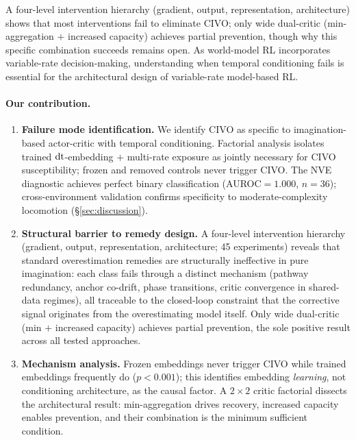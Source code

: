  A four-level intervention hierarchy (gradient, output, representation, architecture) shows that most interventions fail to eliminate CIVO; only wide dual-critic (min-aggregation $+$ increased capacity) achieves partial prevention, though why this specific combination succeeds remains open. As world-model RL incorporates variable-rate decision-making, understanding when temporal conditioning fails is essential for the architectural design of variable-rate model-based RL.

\paragraph{Our contribution.}
\begin{enumerate}[nosep,leftmargin=*]
    \item \textbf{Failure mode identification.} We identify CIVO as specific to imagination-based actor-critic with temporal conditioning. Factorial analysis isolates trained $\mathrm{dt}$-embedding $+$ multi-rate exposure as jointly necessary for CIVO susceptibility; frozen and removed controls never trigger CIVO. The NVE diagnostic achieves perfect binary classification (AUROC${=}1.000$, $n{=}36$); cross-environment validation confirms specificity to moderate-complexity locomotion (\S\ref{sec:discussion}).
    \item \textbf{Structural barrier to remedy design.} A four-level intervention hierarchy (gradient, output, representation, architecture; 45 experiments) reveals that standard overestimation remedies are structurally ineffective in pure imagination: each class fails through a distinct mechanism (pathway redundancy, anchor co-drift, phase transitions, critic convergence in shared-data regimes), all traceable to the closed-loop constraint that the corrective signal originates from the overestimating model itself. Only wide dual-critic (min $+$ increased capacity) achieves partial prevention, the sole positive result across all tested approaches.
    \item \textbf{Mechanism analysis.} Frozen embeddings never trigger CIVO while trained embeddings frequently do ($p < 0.001$); this identifies embedding \emph{learning}, not conditioning architecture, as the causal factor. A $2{\times}2$ critic factorial dissects the architectural result: min-aggregation drives recovery, increased capacity enables prevention, and their combination is the minimum sufficient condition.
\end{enumerate}
